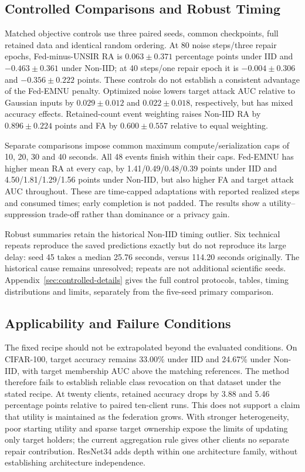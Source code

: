 \subsection{Controlled Comparisons and Robust Timing}
\label{sec:controlled-summary}
Matched objective controls use three paired seeds, common checkpoints, full
retained data and identical random ordering. At 80 noise steps/three repair
epochs, Fed-minus-UNSIR RA is $0.063\pm0.371$ percentage points under IID
and $-0.463\pm0.361$ under Non-IID; at 40 steps/one repair epoch it is
$-0.004\pm0.306$ and $-0.356\pm0.222$ points. These controls do not establish
a consistent advantage of the Fed-EMNU penalty. Optimized noise lowers target
attack AUC relative to Gaussian inputs by $0.029\pm0.012$ and
$0.022\pm0.018$, respectively, but has mixed accuracy effects.
Retained-count event weighting raises Non-IID RA by $0.896\pm0.224$ points
and FA by $0.600\pm0.557$ relative to equal weighting.

Separate comparisons impose common maximum compute/serialization caps of
10, 20, 30 and 40 seconds. All 48 events finish within their caps. Fed-EMNU
has higher mean RA at every cap, by 1.41/0.49/0.48/0.39 points under IID
and 4.50/1.81/1.29/1.56 points under Non-IID, but also higher FA and target
attack AUC throughout. These are time-capped adaptations with reported
realized steps and consumed times; early completion is not padded. The results
show a utility--suppression trade-off rather than dominance or a privacy gain.

Robust summaries retain the historical Non-IID timing outlier. Six technical
repeats reproduce the saved predictions exactly but do not reproduce its large
delay: seed 45 takes a median 25.76 seconds, versus 114.20 seconds originally.
The historical cause remains unresolved; repeats are not additional scientific
seeds. Appendix~\ref{sec:controlled-details} gives the full control protocols,
tables, timing distributions and limits, separately from the five-seed primary
comparison.

\subsection{Applicability and Failure Conditions}
\label{sec:applicability}
The fixed recipe should not be extrapolated beyond the evaluated conditions.
On CIFAR-100, target accuracy remains 33.00\% under IID and 24.67\% under
Non-IID, with target membership AUC above the matching references. The method
therefore fails to establish reliable class revocation on that dataset under
the stated recipe. At twenty clients, retained accuracy drops by 3.88 and 5.46
percentage points relative to paired ten-client runs. This does not support
a claim that utility is maintained as the federation grows. With stronger
heterogeneity, poor starting utility and sparse target ownership expose the
limits of updating only target holders; the current aggregation rule gives
other clients no separate repair contribution. ResNet34 adds depth within one
architecture family, without establishing architecture independence.

